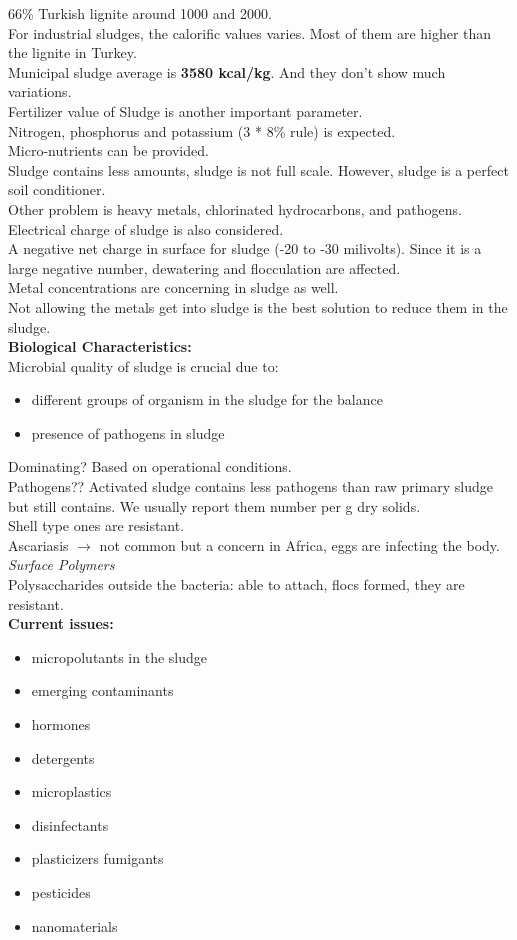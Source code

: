 \documentclass[12pt]{article}
\begin{document}
66\% Turkish lignite around 1000 and 2000.\\
For industrial sludges, the calorific values varies. Most of them are higher than the lignite in Turkey.\\
Municipal sludge average is \textbf{3580 kcal/kg}. And they don't show much variations.\\
Fertilizer value of Sludge is another important parameter.\\
Nitrogen, phosphorus and potassium (3 * 8\% rule) is expected.\\
Micro-nutrients can be provided.\\
Sludge contains less amounts, sludge is not full scale. However, sludge is a perfect soil conditioner.\\%
Other problem is heavy metals, chlorinated hydrocarbons, and pathogens.\\
Electrical charge of sludge is also considered.\\
A negative net charge in surface for sludge (-20 to -30 milivolts). Since it is a large negative number, dewatering and flocculation are affected.\\
Metal concentrations are concerning in sludge as well.\\
Not allowing the metals get into sludge is the best solution to reduce them in the sludge.\\
\textbf{Biological Characteristics:}\\
Microbial quality of sludge is crucial due to:
\begin{itemize}
    \item different groups of organism in the sludge for the balance
    \item presence of pathogens in sludge
\end{itemize}
Dominating? Based on operational conditions.\\
Pathogens?? Activated sludge contains less pathogens than raw primary sludge but still contains. We usually report them number per g dry solids.\\
Shell type ones are resistant.\\
Ascariasis $\rightarrow$ not common but a concern in Africa, eggs are infecting the body.
\textit{Surface Polymers}\\
Polysaccharides outside the bacteria: able to attach, flocs formed, they are resistant.\\
\textbf{Current issues:}
\begin{itemize}
    \item micropolutants in the sludge
    \item emerging contaminants
    \item hormones
    \item detergents
    \item microplastics
    \item disinfectants
    \item plasticizers fumigants
    \item pesticides
    \item nanomaterials
\end{itemize}
\end{document}
